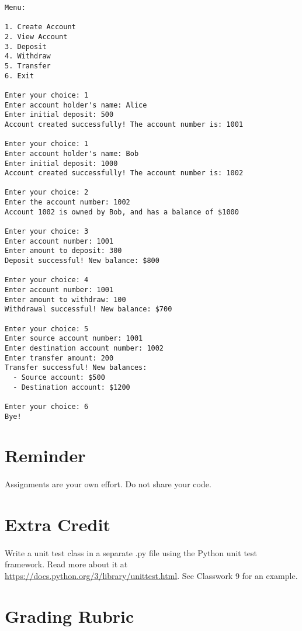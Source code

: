 \documentclass[letter,10pt]{article}
\begin{document}
    \begin{verbatim}
Menu:

1. Create Account
2. View Account
3. Deposit
4. Withdraw
5. Transfer
6. Exit

Enter your choice: 1
Enter account holder's name: Alice
Enter initial deposit: 500
Account created successfully! The account number is: 1001

Enter your choice: 1
Enter account holder's name: Bob
Enter initial deposit: 1000
Account created successfully! The account number is: 1002

Enter your choice: 2
Enter the account number: 1002
Account 1002 is owned by Bob, and has a balance of $1000

Enter your choice: 3
Enter account number: 1001
Enter amount to deposit: 300
Deposit successful! New balance: $800

Enter your choice: 4
Enter account number: 1001
Enter amount to withdraw: 100
Withdrawal successful! New balance: $700

Enter your choice: 5
Enter source account number: 1001
Enter destination account number: 1002
Enter transfer amount: 200
Transfer successful! New balances:
  - Source account: $500
  - Destination account: $1200

Enter your choice: 6
Bye!
    \end{verbatim}
    
    \section*{Reminder}
    \paragraph{}Assignments are your own effort. Do not share your code.
    
    \section*{Extra Credit}
    \paragraph{}Write a unit test class in a separate .py file using the Python unit test framework. Read more about it at \url{https://docs.python.org/3/library/unittest.html}. See Classwork 9 for an example.
    
    \section*{Grading Rubric}
\end{document}
